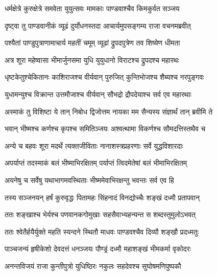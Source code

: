 

\twolineshloka
{धर्मक्षेत्रे कुरुक्षेत्रे समवेता युयुत्सवः}
{मामकाः पाण्डवाश्चैव किमकुर्वत सञ्जय}%


\twolineshloka
{दृष्ट्वा तु पाण्डवानीकं व्यूढं दुर्योधनस्तदा}
{आचार्यमुपसङ्गम्य राजा वचनमब्रवीत्}%

\twolineshloka
{पश्यैतां पाण्डुपुत्राणामाचार्य महतीं चमूम्}
{व्यूढां द्रुपदपुत्रेण तव शिष्येण धीमता}%

\twolineshloka
{अत्र शूरा महेष्वासा भीमार्जुनसमा युधि}
{युयुधानो विराटश्च द्रुपदश्च महारथः}%

\twolineshloka
{धृष्टकेतुश्चेकितानः काशिराजश्च वीर्यवान्}
{पुरुजित् कुन्तिभोजश्च शैब्यश्च नरपुङ्गवः}%

\twolineshloka
{युधामन्युश्च विक्रान्त उत्तमौजाश्च वीर्यवान्}
{सौभद्रो द्रौपदेयाश्च सर्व एव महारथाः}%

\twolineshloka
{अस्माकं तु विशिष्टा ये तान् निबोध द्विजोत्तम}
{नायका मम सैन्यस्य संज्ञार्थं तान् ब्रवीमि ते}%

\twolineshloka
{भवान् भीष्मश्च कर्णश्च कृपश्च समितिञ्जयः}
{अश्वत्थामा विकर्णश्च सौमदत्तिस्तथैव च}%

\twolineshloka
{अन्ये च बहवः शूरा मदर्थे त्यक्तजीविताः}
{नानाशस्त्रप्रहरणाः सर्वे युद्धविशारदाः}%

\twolineshloka
{अपर्याप्तं तदस्माकं बलं भीष्माभिरक्षितम्}
{पर्याप्तं त्विदमेतेषां बलं भीमाभिरक्षितम्}%

\twolineshloka
{अयनेषु च सर्वेषु यथाभागमवस्थिताः}
{भीष्ममेवाभिरक्षन्तु भवन्तः सर्व एव हि}%

\twolineshloka
{तस्य सञ्जनयन् हर्षं कुरुवृद्धः पितामहः}
{सिंहनादं विनद्योच्चैः शङ्खं दध्मौ प्रतापवान्}%

\twolineshloka
{ततः शङ्खाश्च भेर्यश्च पणवानकगोमुखाः}
{सहसैवाभ्यहन्यन्त स शब्दस्तुमुलोऽभवत्}%

\twolineshloka
{ततः श्वेतैर्हयैर्युक्ते महति स्यन्दने स्थितौ}
{माधवः पाण्डवश्चैव दिव्यौ शङ्खौ प्रदध्मतुः}%

\twolineshloka
{पाञ्चजन्यं हृषीकेशो देवदत्तं धनञ्जयः}
{पौण्ड्रं दध्मौ महाशङ्खं भीमकर्मा वृकोदरः}%

\twolineshloka
{अनन्तविजयं राजा कुन्तीपुत्रो युधिष्ठिरः}
{नकुलः सहदेवश्च सुघोषमणिपुष्पकौ}%

